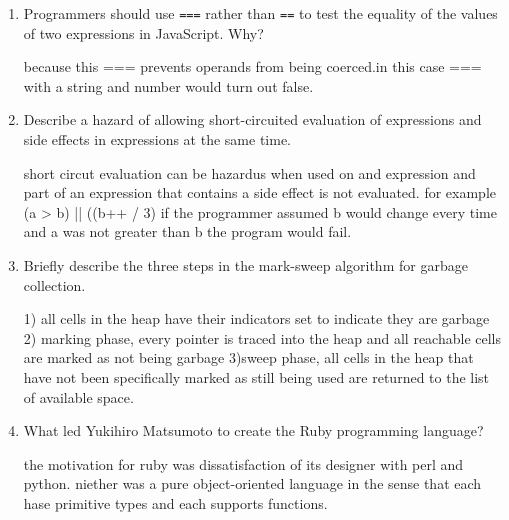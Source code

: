 \begin{enumerate}
  \item Programmers should use \verb+===+ rather than \verb+==+ to
    test the equality of the values of two expressions in JavaScript. Why?

  \begin{answer}

    because this ===  prevents operands from being coerced.in this case === with a string
    and number would turn out false.

    \end{answer}

  \item Describe a hazard of allowing short-circuited evaluation
    of expressions and side effects in expressions at the same time.

  \begin{answer}

   short circut evaluation can be hazardus when used on and expression and part of an 
   expression that contains a side effect is not evaluated. 
   for example (a > b) || ((b++ / 3) if the programmer assumed b would change every 
   time and a was not greater than b the program would fail. 

    \end{answer}

  \item Briefly describe the three steps in the mark-sweep algorithm
    for garbage collection.

  \begin{answer}

  1) all cells in the heap have their indicators set to indicate they are garbage
  2) marking phase, every pointer is traced into the heap and all reachable cells are 
  marked as not being garbage
  3)sweep phase, all cells in the heap that have not been specifically marked as still
  being used are returned to the list of available space.

    \end{answer}

  \item What led Yukihiro Matsumoto to create the Ruby programming language?

  \begin{answer}

   the motivation for ruby was dissatisfaction of its designer with perl and python.
   niether was a pure object-oriented language in the sense that each hase primitive
   types and each supports functions.

    \end{answer}


\end{enumerate}
